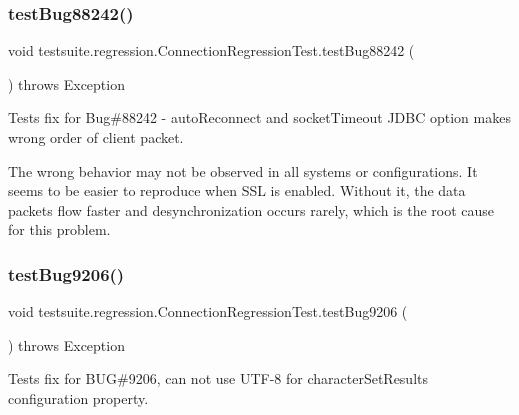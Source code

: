\subsubsection{\texorpdfstring{test\+Bug88242()}{testBug88242()}}
{\footnotesize\ttfamily void testsuite.\+regression.\+Connection\+Regression\+Test.\+test\+Bug88242 (\begin{DoxyParamCaption}{ }\end{DoxyParamCaption}) throws Exception}

Tests fix for Bug\#88242 -\/ auto\+Reconnect and socket\+Timeout J\+D\+BC option makes wrong order of client packet.

The wrong behavior may not be observed in all systems or configurations. It seems to be easier to reproduce when S\+SL is enabled. Without it, the data packets flow faster and desynchronization occurs rarely, which is the root cause for this problem. \mbox{\label{classtestsuite_1_1regression_1_1_connection_regression_test_a296d1449fdc8a1628b7029ab70e450e8}} 
\subsubsection{\texorpdfstring{test\+Bug9206()}{testBug9206()}}
{\footnotesize\ttfamily void testsuite.\+regression.\+Connection\+Regression\+Test.\+test\+Bug9206 (\begin{DoxyParamCaption}{ }\end{DoxyParamCaption}) throws Exception}

Tests fix for B\+UG\#9206, can not use \textquotesingle{}U\+T\+F-\/8\textquotesingle{} for character\+Set\+Results configuration property. \mbox{\label{classtestsuite_1_1regression_1_1_connection_regression_test_a263450ae42667048cb087d436159096d}} 
